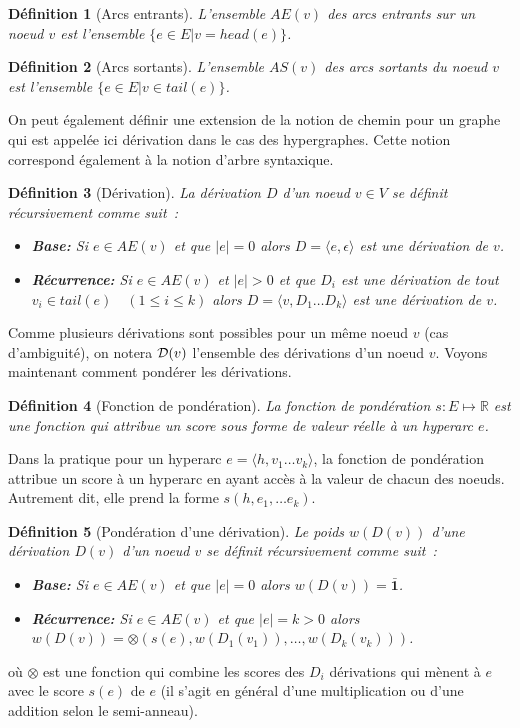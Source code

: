 \documentclass[11pt,openany]{book}
\newtheorem{definition}{Définition}[chapter]
\begin{document}
\begin{definition}[Arcs entrants]
L'ensemble $AE(v)$ des arcs entrants sur un noeud $v$ est l'ensemble $\{e \in E | v =  head(e) \}$.
\end{definition}

\begin{definition}[Arcs sortants]
L'ensemble $AS(v)$ des arcs sortants du noeud $v$ est l'ensemble $\{e \in E | v \in tail(e) \}$.
\end{definition}

On peut également définir une extension de la notion de chemin pour un graphe 
qui est appelée ici dérivation dans le cas des hypergraphes. Cette notion correspond également à la notion d'arbre syntaxique.

\begin{definition}[Dérivation]
La dérivation $D$ d'un noeud $v \in V$ se définit récursivement comme suit~: 
\begin{itemize}
\item {\bf Base:} Si $e \in AE(v)$ et que $|e| = 0$ alors $D = \langle e,\epsilon\rangle$ est une dérivation de $v$.
\item {\bf Récurrence:} Si $e \in AE(v)$ et $|e| > 0$ et que $D_i$ est une dérivation de tout $v_i \in tail(e) \quad (1\leq i \leq k)$   
alors $D = \langle v, D_1\ldots D_k \rangle$ est une dérivation de $v$. 
\end{itemize}
\end{definition}
Comme plusieurs dérivations sont possibles pour un même noeud $v$ (cas d'ambiguité),
on notera ${\cal D}(v)$ l'ensemble des dérivations d'un noeud $v$. Voyons maintenant comment pondérer les dérivations.

\begin{definition}[Fonction de pondération]
La fonction de pondération $s:E\mapsto \mathbb{R}$ est une fonction qui attribue un score sous forme de valeur réelle
à un hyperarc $e$. 
\end{definition}
Dans la pratique pour un hyperarc $e=\langle h, v_1\ldots v_k \rangle$, la fonction de pondération attribue un score
à un hyperarc en ayant accès à la valeur de chacun des noeuds. Autrement dit, elle prend la forme $s(h,e_1,\ldots e_k)$.

\begin{definition}[Pondération d'une dérivation]
Le poids $w(D(v))$ d'une dérivation $D(v)$ d'un noeud $v$ se définit récursivement comme suit~: 
\begin{itemize}
\item {\bf Base:} Si $e \in AE(v)$ et que $|e| = 0$ alors $w(D(v))  = \mathbf{\bar{1}}$. 
\item {\bf Récurrence:} Si $e \in AE(v)$ et que $|e| = k > 0$ alors $w(D(v)) = \otimes(s(e), w(D_1(v_1)), \ldots , w(D_k(v_k)))$.
\end{itemize}
\end{definition}
où $\otimes$ est une fonction qui combine les scores des $D_i$ dérivations qui mènent à $e$ avec le score $s(e)$ de $e$
(il s'agit en général d'une multiplication  ou d'une addition selon le semi-anneau).
\end{document}
